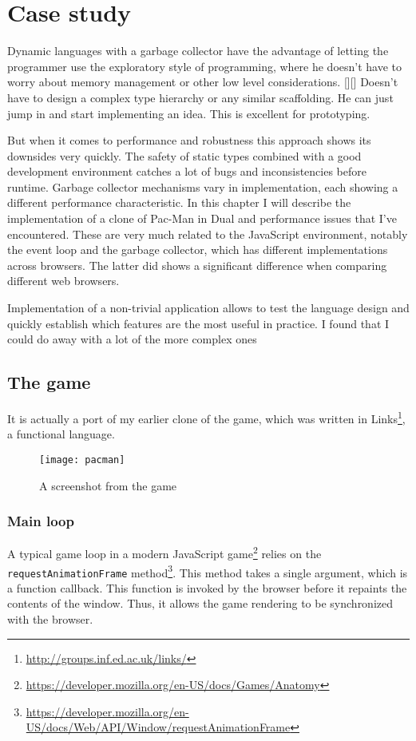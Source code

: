 \chapter{Case study}\label{chap:case}
Dynamic languages with a garbage collector have the advantage of letting the programmer use the exploratory style of programming, where he doesn't have to worry about memory management or other low level considerations. [][] Doesn't have to design a complex type hierarchy or any similar scaffolding. He can just jump in and start implementing an idea. This is excellent for prototyping.

But when it comes to performance and robustness this approach shows its downsides very quickly. The safety of static types combined with a good development environment catches a lot of bugs and inconsistencies before runtime. Garbage collector mechanisms vary in implementation, each showing a different performance characteristic. In this chapter I will describe the implementation of a clone of Pac-Man in Dual and performance issues that I've encountered. These are very much related to the JavaScript environment, notably the event loop and the garbage collector, which has different implementations across browsers. The latter did shows a significant difference when comparing different web browsers.

Implementation of a non-trivial application allows to test the language design and quickly establish which features are the most useful in practice.
I found that I could do away with a lot of the more complex ones %

\section{The game}
It is actually a port of my earlier clone of the game, which was written in Links\footnote{\url{http://groups.inf.ed.ac.uk/links/}}, a functional language.

\begin{figure}[h!]
\centering
\texttt{[image: pacman]}
\caption{A screenshot from the game}
\label{fig:pacman}
\end{figure}

\subsection{Main loop}
A typical game loop in a modern JavaScript game\footnote{\url{https://developer.mozilla.org/en-US/docs/Games/Anatomy}} relies on the \texttt{requestAnimationFrame} method\footnote{\url{https://developer.mozilla.org/en-US/docs/Web/API/Window/requestAnimationFrame}}. This method takes a single argument, which is a function callback. This function is invoked by the browser before it repaints the contents of the window. Thus, it allows the game rendering to be synchronized with the browser.

